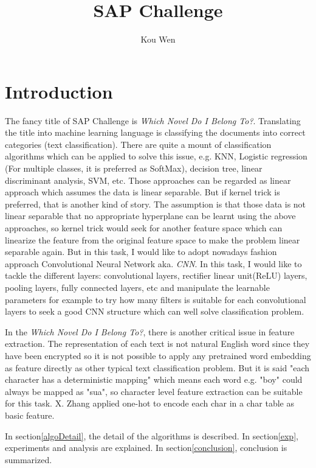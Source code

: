 \documentclass[a4paper]{article}
\title{SAP Challenge}
\author{Kou Wen}
\begin{document}
\maketitle

\section{Introduction}

The fancy title of SAP Challenge is \emph{Which Novel Do I Belong To?}. Translating the title into machine learning language is classifying the documents into correct categories (text classification). There are quite a mount of classification algorithms which can be applied to solve this issue, e.g. KNN, Logistic regression (For multiple classes, it is preferred as SoftMax), decision tree, linear discriminant analysis, SVM, etc. Those approaches can be regarded as linear approach which assumes the data is linear separable. But if kernel trick is preferred, that is another kind of story. The assumption is that those data is not linear separable that no appropriate hyperplane can be learnt using the above approaches, so kernel trick would seek for another feature space which can linearize the feature from the original feature space to make the problem linear separable again. But in this task, I would like to adopt nowadays fashion approach Convolutional Neural Network aka. \emph{CNN}. In this task, I would like to tackle the different layers: convolutional layers, rectifier linear unit(ReLU) layers, pooling layers, fully connected layers, etc and manipulate the learnable parameters for example to try how many filters is suitable for each convolutional layers to seek a good CNN structure which can well solve classification problem.

In the \emph{Which Novel Do I Belong To?}, there is another critical issue in feature extraction. The representation of each text is not natural English word since they have been encrypted so it is not possible to apply any pretrained word embedding as feature directly as other typical text classification problem. But it is said "each character has a deterministic mapping" which means each word e.g. "boy" could always be mapped as "sua", so character level feature extraction can be suitable for this task. X. Zhang \cite{ZhangZL15} applied one-hot to encode each char in a char table as basic feature.

In section\ref{algoDetail}, the detail of the algorithms is described. In section\ref{exp}, experiments and analysis are explained. In section\ref{conclusion}, conclusion is summarized.
\end{document}
